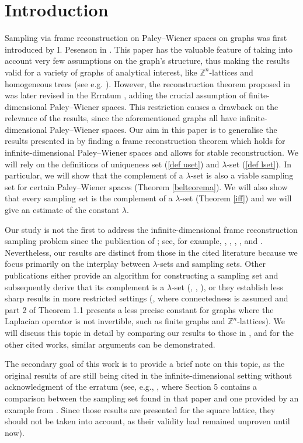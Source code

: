 \documentclass[12pt]{amsart}
\theoremstyle{definition}
\numberwithin{equation}{section}
\theoremstyle{definition}
\theoremstyle{remark}
\numberwithin{equation}{section}
\begin{document}
\section{Introduction}
Sampling via frame reconstruction on Paley--Wiener spaces on graphs was first introduced by I. Pesenson in \cite{PW1}. This paper has the valuable feature of taking into account very few assumptions on the graph's structure, thus making the results valid for a variety of graphs of analytical interest, like $\mathbb{Z}^n$-lattices and homogeneous trees (see e.g. \cite{figa}). However, the reconstruction theorem proposed in \cite{PW1} was later revised in the Erratum \cite{PW2}, adding the crucial assumption of finite-dimensional Paley--Wiener spaces. This restriction causes a drawback on the relevance of the results, since the aforementioned graphs all have infinite-dimensional Paley--Wiener spaces. Our aim in this paper is to generalise the results presented in \cite{PW1} by finding a frame reconstruction theorem which holds for infinite-dimensional Paley--Wiener spaces and allows for stable reconstruction. We will rely on the definitions of uniqueness set (\ref{def uset}) and $\lambda$-set (\ref{def lset}). In particular, we will show that the complement of a $\lambda$-set is also a viable sampling set for certain Paley--Wiener spaces (Theorem \ref{belteorema}). We will also show that every sampling set is the complement of a $\lambda$-set (Theorem \ref{iff}) and we will give an estimate of the constant $\lambda$.

Our study is not the first to address the infinite-dimensional frame reconstruction sampling problem since the publication of \cite{PW2}; see, for example, \cite{FG}, \cite{FP}, \cite{P}, \cite{PP1}, and \cite{PP2}. Nevertheless, our results are distinct from those in the cited literature because we focus primarily on the interplay between $\mathbb{\lambda}$-sets and sampling sets. Other publications either provide an algorithm for constructing a sampling set and subsequently derive that its complement is a $\lambda$-set (\cite{FG}, \cite{FP}, \cite{PP1}), or they establish less sharp results in more restricted settings (\cite{P}, where connectedness is assumed and part 2 of Theorem 1.1 presents a less precise constant for graphs where the Laplacian operator is not invertible, such as finite graphs and $\mathbb{Z}^n$-lattices). We will discuss this topic in detail by comparing our results to those in \cite{FP}, and for the other cited works, similar arguments can be demonstrated. 

The secondary goal of this work is to provide a brief note on this topic, as the original results of \cite{PW1} are still being cited in the infinite-dimensional setting without acknowledgment of the erratum (see, e.g., \cite{MM}, where Section 5 contains a comparison between the sampling set found in that paper and one provided by an example from \cite{PW1}. Since those results are presented for the square lattice, they should not be taken into account, as their validity had remained unproven until now).
\end{document}
